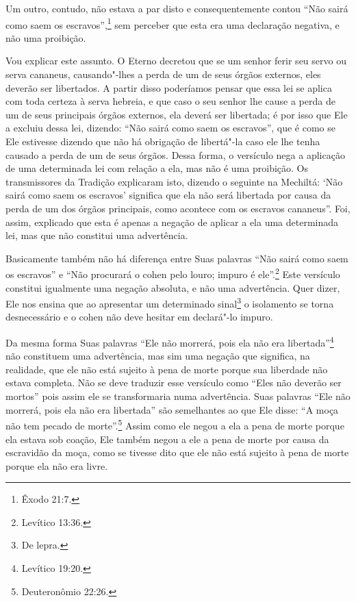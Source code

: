 Um outro, contudo, não estava a par disto e consequentemente contou
``Não sairá como saem os escravos'',\footnote{Êxodo 21:7.} sem perceber que esta
era uma declaração negativa, e não uma proibição.

Vou explicar este assunto. O Eterno decretou que se um senhor ferir seu
servo ou serva cananeus, causando"-lhes a perda de um de seus órgãos
externos, eles deverão ser libertados. A partir disso poderíamos pensar
que essa lei se aplica com toda certeza à serva hebreia, e que caso o
seu senhor lhe cause a perda de um de seus principais órgãos externos,
ela deverá ser libertada; é por isso que Ele a excluiu dessa lei,
dizendo: ``Não sairá como saem os escravos'', que é como se Ele
estivesse dizendo que não há obrigação de libertá"-la caso ele lhe tenha
causado a perda de um de seus órgãos. Dessa forma, o versículo nega a
aplicação de uma determinada lei com relação a ela, mas não é uma
proibição. Os transmissores da Tradição explicaram isto, dizendo o
seguinte na Mechiltá\starr: `Não sairá como saem os escravos' significa que
ela não será libertada por causa da perda de um dos órgãos principais,
como acontece com os escravos cananeus''. Foi, assim, explicado que esta
é apenas a negação de aplicar a ela uma determinada lei, mas que não
constitui uma advertência.

Basicamente também não há diferença entre Suas palavras ``Não sairá como saem os escravos'' e ``Não procurará o cohen\starr{} pelo louro;
impuro
é ele''.\footnote{Levítico 13:36.} Este versículo constitui igualmente uma
negação absoluta, e não uma advertência. Quer dizer, Ele nos ensina que ao
apresentar um determinado sinal\footnote{De lepra.} o isolamento se
torna desnecessário e o cohen\starr{} não deve hesitar em declará"-lo impuro.

Da mesma forma Suas palavras ``Ele não morrerá, pois ela não era
libertada''\footnote{Levítico 19:20.} não constituem uma advertência, mas sim uma
negação que significa, na realidade, que ele não está sujeito à pena de
morte porque sua liberdade não estava completa. Não se deve traduzir
esse versículo como ``Eles não deverão ser mortos'' pois assim ele se
transformaria numa advertência. Suas palavras ``Ele não morrerá, pois
ela não era libertada'' são semelhantes ao que Ele disse: ``A moça não tem pecado de morte''.\footnote{Deuteronômio 22:26.} Assim como ele negou a ela a pena de morte porque
ela estava sob coação, Ele também negou a ele a pena de morte por causa
da escravidão da moça, como se tivesse dito que ele não está sujeito à
pena de morte porque ela não era livre.

